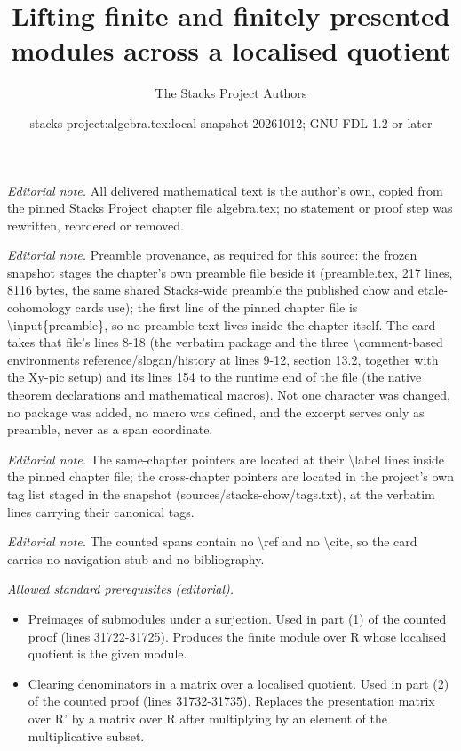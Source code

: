 \documentclass[10pt,a4paper]{amsart}
\title{Lifting finite and finitely presented modules across a localised quotient}
\author{The Stacks Project Authors}
\date{stacks-project:algebra.tex:local-snapshot-20261012; GNU FDL 1.2 or later}
\theoremstyle{plain}
\theoremstyle{definition}
\theoremstyle{remark}
\numberwithin{equation}{subsection}
\begin{document}
\maketitle
\noindent\textit{Editorial note.} All delivered mathematical text is the author's own, copied from the pinned Stacks Project chapter file algebra.tex; no statement or proof step was rewritten, reordered or removed.\par\medskip
\noindent\textit{Editorial note.} Preamble provenance, as required for this source: the frozen snapshot stages the chapter's own preamble file beside it (preamble.tex, 217 lines, 8116 bytes, the same shared Stacks-wide preamble the published chow and etale-cohomology cards use); the first line of the pinned chapter file is \textbackslash{}input\{preamble\}, so no preamble text lives inside the chapter itself. The card takes that file's lines 8-18 (the verbatim package and the three \textbackslash{}comment-based environments reference/slogan/history at lines 9-12, section 13.2, together with the Xy-pic setup) and its lines 154 to the runtime end of the file (the native theorem declarations and mathematical macros). Not one character was changed, no package was added, no macro was defined, and the excerpt serves only as preamble, never as a span coordinate.\par\medskip
\noindent\textit{Editorial note.} The same-chapter pointers are located at their \textbackslash{}label lines inside the pinned chapter file; the cross-chapter pointers are located in the project's own tag list staged in the snapshot (sources/stacks-chow/tags.txt), at the verbatim lines carrying their canonical tags.\par\medskip
\noindent\textit{Editorial note.} The counted spans contain no \textbackslash{}ref and no \textbackslash{}cite, so the card carries no navigation stub and no bibliography.\par\medskip
\noindent\textit{Allowed standard prerequisites (editorial).}\begin{itemize}
\item Preimages of submodules under a surjection. Used in part (1) of the counted proof (lines 31722-31725). Produces the finite module over R whose localised quotient is the given module.
\item Clearing denominators in a matrix over a localised quotient. Used in part (2) of the counted proof (lines 31732-31735). Replaces the presentation matrix over R' by a matrix over R after multiplying by an element of the multiplicative subset.
\end{itemize}\medskip
\end{document}
